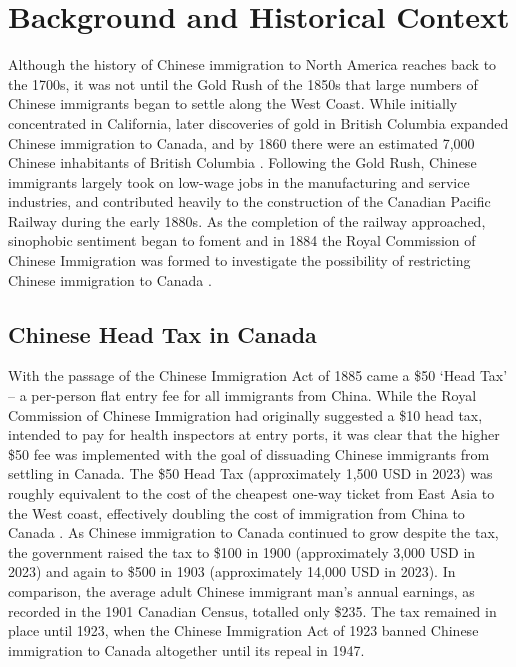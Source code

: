 \section{Background and Historical Context}
Although the history of Chinese immigration to North America reaches back to the 1700s, it was not until the Gold Rush of the 1850s that large numbers of Chinese immigrants began to settle along the West Coast. 
While initially concentrated in California, later discoveries of gold in British Columbia expanded Chinese immigration to Canada, and by 1860 there were an estimated 7,000 Chinese inhabitants of British Columbia \citep{chan2019}.
Following the Gold Rush, Chinese immigrants largely took on low-wage jobs in the manufacturing and service industries, and contributed heavily to the construction of the Canadian Pacific Railway during the early 1880s.
As the completion of the railway approached, sinophobic sentiment began to foment and in 1884 the Royal Commission of Chinese Immigration was formed to investigate the possibility of restricting Chinese immigration to Canada \citep{chan2016}.

\subsection{Chinese Head Tax in Canada}
With the passage of the Chinese Immigration Act of 1885 came a \$50 `Head Tax' -- a per-person flat entry fee for all immigrants from China. While the Royal Commission of Chinese Immigration had originally suggested a \$10 head tax, intended to pay for health inspectors at entry ports, it was clear that the higher \$50 fee was implemented with the goal of dissuading Chinese immigrants from settling in Canada. 
The \$50 Head Tax (approximately 1,500 USD in 2023) was roughly equivalent to the cost of the cheapest one-way ticket from East Asia to the West coast, effectively doubling the cost of immigration from China to Canada \citep{boatcost}. As Chinese immigration to Canada continued to grow despite the tax, the government raised the tax to \$100 in 1900 (approximately 3,000 USD in 2023) and again to \$500 in 1903 (approximately 14,000 USD in 2023). In comparison, the average adult Chinese immigrant man's annual earnings, as recorded in the 1901 Canadian Census, totalled only \$235. The tax remained in place until 1923, when the Chinese Immigration Act of 1923 banned Chinese immigration to Canada altogether until its repeal in 1947.

